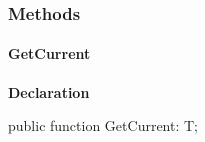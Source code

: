 \documentclass{report}
\begin{document}
\subsubsection*{\large{\textbf{Methods}}\normalsize\hspace{1ex}\hfill}
\paragraph*{GetCurrent}\hspace*{\fill}

\begin{list}{}{
\setlength{\itemindent}{0cm}
\setlength{\listparindent}{0cm}
\setlength{\leftmargin}{\evensidemargin}
\addtolength{\leftmargin}{\tmplength}
\settowidth{\labelsep}{X}
\addtolength{\leftmargin}{\labelsep}
\setlength{\labelwidth}{\tmplength}
}
\begin{flushleft}
\item[\textbf{Declaration}\hfill]
\begin{ttfamily}
public function GetCurrent: T;\end{ttfamily}


\end{flushleft}
\end{list}
\end{document}
